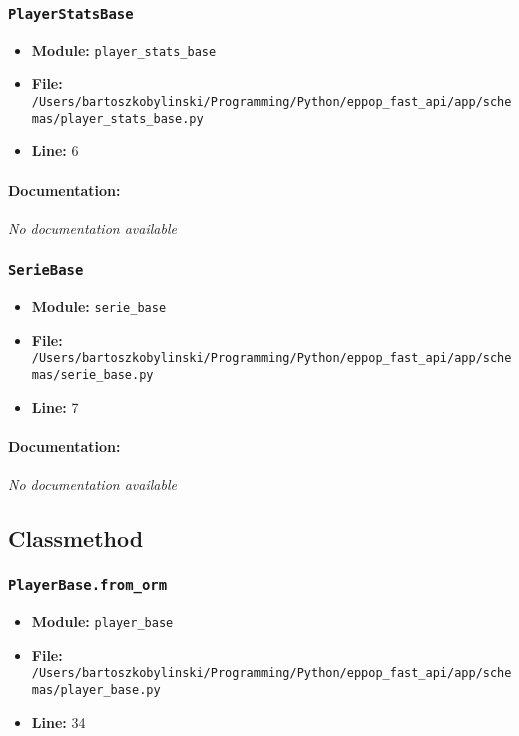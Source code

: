\documentclass[11pt,a4paper]{article}
\begin{document}
\vspace{1em}
\subsubsection{\texttt{PlayerStatsBase}}

\begin{itemize}
    \item \textbf{Module:} \texttt{player\_stats\_base}
    \item \textbf{File:} \texttt{/Users/bartoszkobylinski/Programming/Python/eppop\_fast\_api/app/schemas/player\_stats\_base.py}
    \item \textbf{Line:} 6
\end{itemize}

\paragraph{Documentation:} \textit{No documentation available}


\vspace{1em}
\subsubsection{\texttt{SerieBase}}

\begin{itemize}
    \item \textbf{Module:} \texttt{serie\_base}
    \item \textbf{File:} \texttt{/Users/bartoszkobylinski/Programming/Python/eppop\_fast\_api/app/schemas/serie\_base.py}
    \item \textbf{Line:} 7
\end{itemize}

\paragraph{Documentation:} \textit{No documentation available}


\vspace{1em}
\subsection{Classmethod}

\subsubsection{\texttt{PlayerBase.from\_orm}}

\begin{itemize}
    \item \textbf{Module:} \texttt{player\_base}
    \item \textbf{File:} \texttt{/Users/bartoszkobylinski/Programming/Python/eppop\_fast\_api/app/schemas/player\_base.py}
    \item \textbf{Line:} 34
\end{itemize}
\end{document}
